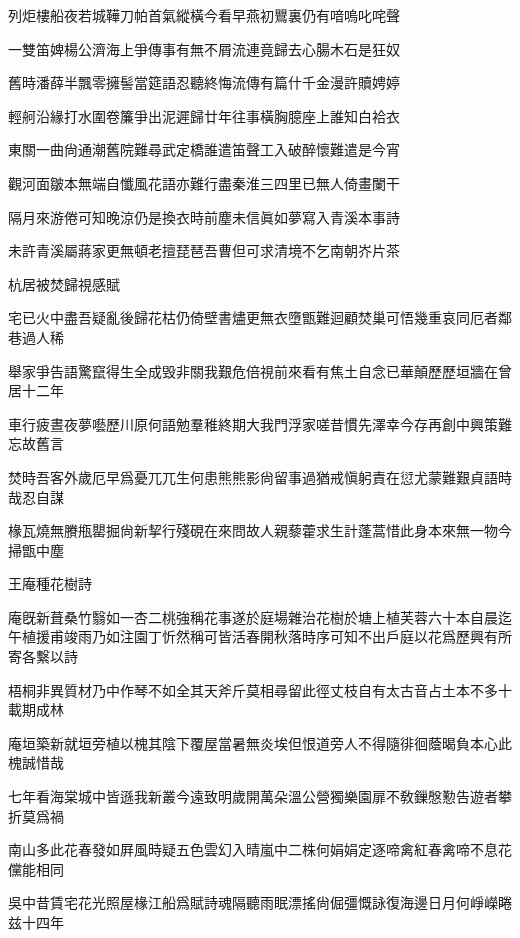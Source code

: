 \documentclass{zhvt-classic-Miya}
\begin{document}
列炬樓船夜若城鞾刀帕首氣縱橫今看早燕初鸎裏仍有喑嗚叱咤聲

一雙笛婢楊公濟海上爭傳事有無不屑流連竟歸去心腸木石是狂奴

舊時潘薛半飄零擁髻當筵語忍聽終悔流傳有篇什千金漫許贖娉婷

輕舸沿緣打水圍卷簾爭出泥遲歸廿年往事橫胸臆座上誰知白袷衣

東關一曲尙通潮舊院難尋武定橋誰遣笛聲工入破醉懷難遣是今宵

觀河面皺本無端自懺風花語亦難行盡秦淮三四里已無人倚畫闌干

隔月來游倦可知晚涼仍是換衣時前塵未信眞如夢寫入青溪本事詩

未許青溪屬蔣家更無頓老擅琵琶吾曹但可求清境不乞南朝岕片茶

\begin{fw}杭居被焚歸視感賦\end{fw}

宅已火中盡吾疑亂後歸花枯仍倚壁書燼更無衣墮甑難迴顧焚巢可悟幾重哀同厄者鄰巷過人稀

舉家爭告語驚竄得生全成毁非關我艱危倍視前來看有焦土自念已華顛歷歷垣牆在曾居十二年

車行疲晝夜夢囈歷川原何語勉羣稚終期大我門浮家嗟昔慣先澤幸今存再創中興策難忘故舊言

焚時吾客外歲厄早爲憂兀兀生何患熊熊影尙留事過猶戒愼躬責在愆尤蒙難艱貞語時哉忍自謀

椽瓦燒無賸甁罌掘尙新挈行殘硯在來問故人親藜藿求生計蓬蒿惜此身本來無一物今掃甑中塵

\begin{fw}王庵種花樹詩\end{fw}

庵旣新葺桑竹翳如一杏二桃強稱花事遂於庭場雜治花樹於塘上植芙蓉六十本自晨迄午植援甫竣雨乃如注園丁忻然稱可皆活春開秋落時序可知不出戶庭以花爲歷興有所寄各繫以詩

梧桐非異質材乃中作琴不如全其天斧斤莫相尋留此徑丈枝自有太古音占土本不多十載期成林

庵垣築新就垣旁植以槐其陰下覆屋當暑無炎埃但恨道旁人不得隨徘徊蔭暍負本心此槐誠惜哉

七年看海棠城中皆遜我新叢今遠致明歲開萬朵溫公營獨樂園扉不敎鏁慇懃告遊者攀折莫爲禍

南山多此花春發如屛風時疑五色雲幻入晴嵐中二株何娟娟定逐啼禽紅春禽啼不息花儻能相同

吳中昔賃宅花光照屋椽江船爲賦詩魂隔聽雨眠漂搖尙倔彊慨詠復海邊日月何崢嶸睠兹十四年
\end{document}
